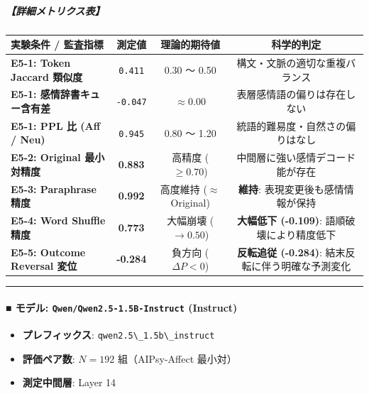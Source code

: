 \subparagraph{【詳細メトリクス表】}
\begin{center}
\small
\begin{tabular}{lccc}
\toprule
\textbf{実験条件 / 監査指標} & \textbf{測定値} & \textbf{理論的期待値} & \textbf{科学的判定} \\
\midrule
\textbf{E5-1: Token Jaccard 類似度} & \texttt{0.411} & 0.30 〜 0.50 & 構文・文脈の適切な重複バランス \\
\textbf{E5-1: 感情辞書キュー含有差} & \texttt{-0.047} & $\approx 0.00$ & 表層感情語の偏りは存在しない \\
\textbf{E5-1: PPL 比 (Aff / Neu)} & \texttt{0.945} & 0.80 〜 1.20 & 統語的難易度・自然さの偏りはなし \\
\textbf{E5-2: Original 最小対精度} & \textbf{0.883} & 高精度 ($\ge 0.70$) & 中間層に強い感情デコード能が存在 \\
\textbf{E5-3: Paraphrase 精度} & \textbf{0.992} & 高度維持 ($\approx$ Original) & \textbf{維持}: 表現変更後も感情情報が保持 \\
\textbf{E5-4: Word Shuffle 精度} & \textbf{0.773} & 大幅崩壊 ($\rightarrow 0.50$) & \textbf{大幅低下 (-0.109)}: 語順破壊により精度低下 \\
\textbf{E5-5: Outcome Reversal 変位} & \textbf{-0.284} & 負方向 ($\Delta P < 0$) & \textbf{反転追従 (-0.284)}: 結末反転に伴う明確な予測変化 \\
\bottomrule
\end{tabular}
\end{center}


\vspace{0.5em}\hrule\vspace{0.5em}

\paragraph{■ モデル: \texttt{Qwen/Qwen2.5-1.5B-Instruct} (Instruct)}
\begin{itemize}
\item \textbf{プレフィックス}: \texttt{qwen2.5\textbackslash{}\_1.5b\textbackslash{}\_instruct}
\item \textbf{評価ペア数}: $N=192$ 組（AIPsy-Affect 最小対）
\item \textbf{測定中間層}: Layer 14
\end{itemize}

